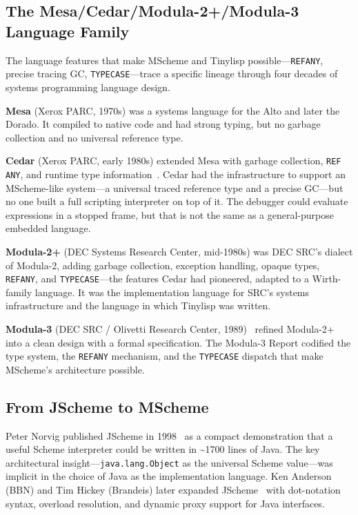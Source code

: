 \documentclass[11pt]{article}
\begin{document}
\subsection{The Mesa/Cedar/Modula-2+/Modula-3 Language Family}
\label{sec:mesa-cedar}

The language features that make MScheme and Tinylisp possible---\texttt{REFANY},
precise tracing GC, \texttt{TYPECASE}---trace a specific lineage
through four decades of systems programming language design.

\textbf{Mesa} (Xerox PARC, 1970s) was a systems language for the Alto
and later the Dorado.  It compiled to native code and had strong
typing, but no garbage collection and no universal reference type.

\textbf{Cedar} (Xerox PARC, early 1980s) extended Mesa with garbage
collection, \texttt{REF ANY}, and runtime type
information~\cite{rovner1985}.  Cedar had the infrastructure to
support an MScheme-like system---a universal traced reference type and
a precise GC---but no one built a full scripting interpreter on top of
it.  The debugger could evaluate expressions in a stopped frame, but
that is not the same as a general-purpose embedded language.

\textbf{Modula-2+} (DEC Systems Research Center, mid-1980s) was DEC
SRC's dialect of Modula-2, adding garbage collection, exception
handling, opaque types, \texttt{REFANY}, and \texttt{TYPECASE}---the
features Cedar had pioneered, adapted to a Wirth-family language.  It
was the implementation language for SRC's systems infrastructure and
the language in which Tinylisp was written.

\textbf{Modula-3} (DEC SRC / Olivetti Research Center,
1989)~\cite{cardelli1989report} refined Modula-2+ into a clean design
with a formal specification.  The Modula-3 Report codified the type
system, the \texttt{REFANY} mechanism, and the \texttt{TYPECASE}
dispatch that make MScheme's architecture possible.


\subsection{From JScheme to MScheme}
\label{sec:jscheme-to-mscheme}

Peter Norvig published JScheme in 1998~\cite{norvig1998} as a compact
demonstration that a useful Scheme interpreter could be written in
\textasciitilde1700 lines of Java.  The key architectural insight---\texttt{java.lang.Object}
as the universal Scheme value---was implicit in the choice of Java as
the implementation language.  Ken Anderson (BBN) and Tim Hickey
(Brandeis) later expanded JScheme~\cite{anderson2003} with
dot-notation syntax, overload resolution, and dynamic proxy support
for Java interfaces.
\end{document}
